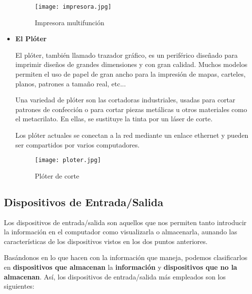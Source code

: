 \begin{itemize}
    \begin{figure}[ht]
        \centering
        \texttt{[image: impresora.jpg]}
        \caption{Impresora multifunción}
    \end{figure}

    \item \textbf{El Plóter}

    El plóter, también llamado trazador gráfico, es un periférico diseñado para imprimir diseños de grandes dimensiones y con gran calidad. Muchos modelos permiten el uso de papel de gran ancho para la impresión de mapas, carteles, planos, patrones a tamaño real, etc...

    Una variedad de plóter son las cortadoras industriales, usadas para cortar patrones de confección o para cortar piezas metálicas u otros materiales como el metacrilato. En ellas, se sustituye la tinta por un láser de corte.

    Los plóter actuales se conectan a la red mediante un enlace ethernet y pueden ser compartidos por varios computadores.

    \begin{figure}[ht]
        \centering
        \texttt{[image: ploter.jpg]}
        \caption{Plóter de corte}
    \end{figure}
\end{itemize}

\subsection{Dispositivos de Entrada/Salida}
Los dispositivos de entrada/salida son aquellos que nos permiten tanto introducir la información en el computador como visualizarla o almacenarla, aunando las características de los dispositivos vistos en los dos puntos anteriores.

Basándonos en lo que hacen con la información que maneja, podemos clasificarlos en \textbf{dispositivos que almacenan} la \textbf{información} y \textbf{dispositivos que no la almacenan}. Así, los dispositivos de entrada/salida más empleados son los siguientes:


